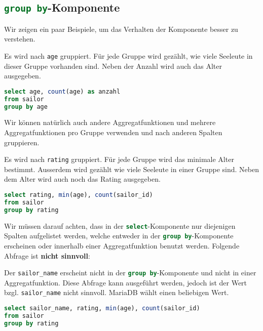\subsection{\lstinline[language=SQL]{group by}-Komponente}

Wir zeigen ein paar Beispiele, um das Verhalten der Komponente besser zu verstehen.

\begin{example}
Es wird nach \lstinline[language=SQL]{age} gruppiert. Für jede Gruppe wird gezählt, wie viele Seeleute in dieser Gruppe vorhanden sind. Neben der Anzahl wird auch das Alter ausgegeben.
\begin{lstlisting}[language=SQL]
select age, count(age) as anzahl
from sailor
group by age
\end{lstlisting}
\end{example}

Wir können natürlich auch andere Aggregatfunktionen und mehrere Aggregatfunktionen pro Gruppe verwenden und nach anderen Spalten gruppieren.

\begin{example}
Es wird nach \lstinline[language=SQL]{rating} gruppiert. Für jede Gruppe wird das minimale Alter bestimmt. Ausserdem wird gezählt wie viele Seeleute in einer Gruppe sind. Neben dem Alter wird auch noch das Rating ausgegeben.
\begin{lstlisting}[language=SQL]
select rating, min(age), count(sailor_id)
from sailor
group by rating
\end{lstlisting}
\end{example}

Wir müssen darauf achten, dass in der \lstinline[language=SQL]{select}-Komponente nur diejenigen Spalten aufgelistet werden, welche entweder in der \lstinline[language=SQL]{group by}-Komponente erscheinen oder innerhalb einer Aggregatfunktion benutzt werden. Folgende Abfrage ist \textbf{nicht sinnvoll}:

\begin{example}
Der \lstinline[language=SQL]{sailor_name} erscheint nicht in der \lstinline[language=SQL]{group by}-Komponente und nicht in einer Aggregatfunktion. Diese Abfrage kann ausgeführt werden, jedoch ist der Wert bzgl. \lstinline[language=SQL]{sailor_name} nicht sinnvoll. MariaDB wählt einen beliebigen Wert.
\begin{lstlisting}[language=SQL]
select sailor_name, rating, min(age), count(sailor_id)
from sailor
group by rating
\end{lstlisting}
\end{example}

